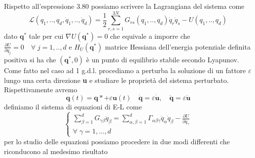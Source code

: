 Rispetto all'espressione 3.80 possiamo scrivere la Lagrangiana del sistema come 
\begin{equation}
	\mathcal{L}(q_1,..,q_d,\dot{q}_1,..,\dot{q}_d) = \frac{1}{2} \sum_{r,s=1}^{3N}G_{rs}(q_1,..,q_d)\dot{q}_r\dot{q}_s - U(q_1,..,q_d)
\end{equation}
dato $\bm{q}^{*}$ tale per cui $\nabla U(\bm{q}^{*}) = 0$ che equivale a imporre che $\frac{\partial U}{\partial q_j} = 0 \quad \forall \; j = 1,..,d$ e $H_{U}(\bm{q}^{*})$ matrice Hessiana dell'energia potenziale definita positiva  si ha che $(\bm{q}^{*},0)$ \`{e} un punto di equilibrio stabile secondo Lyapunov. Come fatto nel caso ad 1 g.d.l. procediamo a perturba la soluzione di un fattore $\varepsilon$ lungo una certa direzione \textbf{u} e studiare le propriet\`{a} del sistema perturbato.
Rispettivamente avremo 
\begin{equation}
\bm{q}(t)=\bm{q}{*}+\varepsilon \bm{u}(t) \quad \bm{\dot{q}}=\varepsilon \dot{\bm{u}}, \quad \ddot{\bm{q}}=\varepsilon \ddot{\bm{u}}
\end{equation}
definiamo il sistema di equazioni di E-L come 
\begin{equation}
\left \{ \begin{array}{l}
\sum_{\beta = 1}^d G_{\gamma \beta} \ddot{q}_\beta=\sum_{\alpha, \beta=1}^d \Gamma_{\alpha \beta \gamma} \dot{q}_\alpha \dot{q}_\beta-\frac{\partial U}{\partial q_\gamma} \\ 
\forall \; \gamma =1,...,d
\end{array} \right .
\end{equation}
per lo studio delle equazioni possiamo procedere in due modi differenti che riconducono al medesimo risultato
